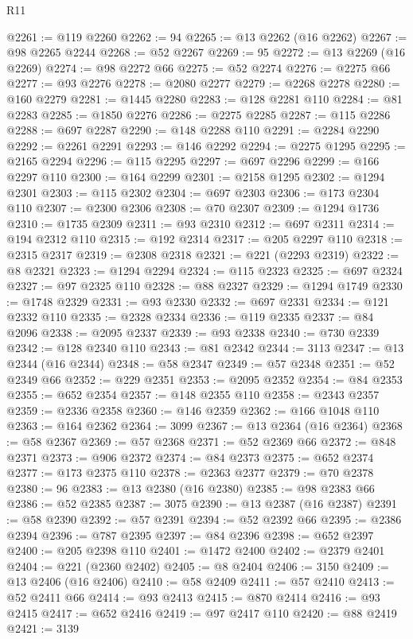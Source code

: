 \begin{lexlean}{R11}
\begin{coremodule}
@2261 := @119 @2260
@2262 := 94
@2265 := @13 @2262 (@16 @2262)
@2267 := @98 @2265 @2244
@2268 := @52 @2267
@2269 := 95
@2272 := @13 @2269 (@16 @2269)
@2274 := @98 @2272 @66
@2275 := @52 @2274
@2276 := @2275 @66
@2277 := @93 @2276
@2278 := @2080 @2277
@2279 := @2268 @2278
@2280 := @160 @2279
@2281 := @1445 @2280
@2283 := @128 @2281 @110
@2284 := @81 @2283
@2285 := @1850 @2276
@2286 := @2275 @2285
@2287 := @115 @2286
@2288 := @697 @2287
@2290 := @148 @2288 @110
@2291 := @2284 @2290
@2292 := @2261 @2291
@2293 := @146 @2292
@2294 := @2275 @1295
@2295 := @2165 @2294
@2296 := @115 @2295
@2297 := @697 @2296
@2299 := @166 @2297 @110
@2300 := @164 @2299
@2301 := @2158 @1295
@2302 := @1294 @2301
@2303 := @115 @2302
@2304 := @697 @2303
@2306 := @173 @2304 @110
@2307 := @2300 @2306
@2308 := @70 @2307
@2309 := @1294 @1736
@2310 := @1735 @2309
@2311 := @93 @2310
@2312 := @697 @2311
@2314 := @194 @2312 @110
@2315 := @192 @2314
@2317 := @205 @2297 @110
@2318 := @2315 @2317
@2319 := @2308 @2318
@2321 := @221 (@2293 @2319)
@2322 := @8 @2321
@2323 := @1294 @2294
@2324 := @115 @2323
@2325 := @697 @2324
@2327 := @97 @2325 @110
@2328 := @88 @2327
@2329 := @1294 @1749
@2330 := @1748 @2329
@2331 := @93 @2330
@2332 := @697 @2331
@2334 := @121 @2332 @110
@2335 := @2328 @2334
@2336 := @119 @2335
@2337 := @84 @2096
@2338 := @2095 @2337
@2339 := @93 @2338
@2340 := @730 @2339
@2342 := @128 @2340 @110
@2343 := @81 @2342
@2344 := 3113
@2347 := @13 @2344 (@16 @2344)
@2348 := @58 @2347
@2349 := @57 @2348
@2351 := @52 @2349 @66
@2352 := @229 @2351
@2353 := @2095 @2352
@2354 := @84 @2353
@2355 := @652 @2354
@2357 := @148 @2355 @110
@2358 := @2343 @2357
@2359 := @2336 @2358
@2360 := @146 @2359
@2362 := @166 @1048 @110
@2363 := @164 @2362
@2364 := 3099
@2367 := @13 @2364 (@16 @2364)
@2368 := @58 @2367
@2369 := @57 @2368
@2371 := @52 @2369 @66
@2372 := @848 @2371
@2373 := @906 @2372
@2374 := @84 @2373
@2375 := @652 @2374
@2377 := @173 @2375 @110
@2378 := @2363 @2377
@2379 := @70 @2378
@2380 := 96
@2383 := @13 @2380 (@16 @2380)
@2385 := @98 @2383 @66
@2386 := @52 @2385
@2387 := 3075
@2390 := @13 @2387 (@16 @2387)
@2391 := @58 @2390
@2392 := @57 @2391
@2394 := @52 @2392 @66
@2395 := @2386 @2394
@2396 := @787 @2395
@2397 := @84 @2396
@2398 := @652 @2397
@2400 := @205 @2398 @110
@2401 := @1472 @2400
@2402 := @2379 @2401
@2404 := @221 (@2360 @2402)
@2405 := @8 @2404
@2406 := 3150
@2409 := @13 @2406 (@16 @2406)
@2410 := @58 @2409
@2411 := @57 @2410
@2413 := @52 @2411 @66
@2414 := @93 @2413
@2415 := @870 @2414
@2416 := @93 @2415
@2417 := @652 @2416
@2419 := @97 @2417 @110
@2420 := @88 @2419
@2421 := 3139

\end{coremodule}
\end{lexlean}
